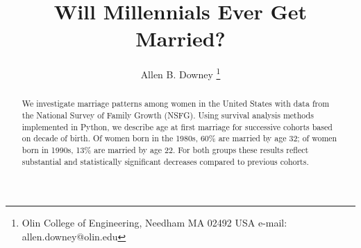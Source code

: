 \documentclass[journal]{IEEEtran}
\begin{document}
%
\title{Will Millennials Ever Get Married?}
%
%
%

\author{Allen B. Downey%
\thanks{Olin College of Engineering, Needham MA 02492 USA e-mail: allen.downey@olin.edu}}





% 











\maketitle


\begin{abstract}
We investigate marriage patterns among women in the United States
with data from the National Survey of Family Growth (NSFG).
Using survival analysis methods implemented in Python, we
describe age at first marriage for successive cohorts based
on decade of birth.  Of women born in the 1980s,
60\% are married by age 32; of women born in 1990s, 13\%
are married by age 22.  For both groups these results reflect
substantial and statistically significant decreases compared to
previous cohorts.
\end{abstract}
\end{document}
